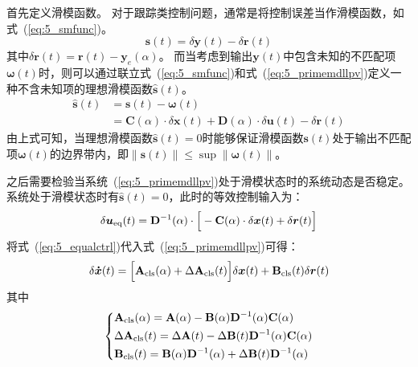 \documentclass{article}
\begin{document}
首先定义滑模函数。
对于跟踪类控制问题，通常是将控制误差当作滑模函数，如式~(\ref{eq:5_smfunc})。
\begin{equation}
\bm{s}(t)=\delta \bm{y}(t) - \delta \bm{r}(t)
\label{eq:5_smfunc}
\end{equation}
其中$\delta \bm{r}(t)=\bm{r}(t)-\bm{y}_e(\alpha)$。
而当考虑到输出$\bm{y}(t)$中包含未知的不匹配项$\bm{\omega}(t)$时，则可以通过联立式~(\ref{eq:5_smfunc})和式~(\ref{eq:5_primemdllpv})定义一种不含未知项的理想滑模函数$\bm{\hat s}(t)$。
\begin{equation}
\begin{aligned}
\bm{\hat s}(t) &= \bm{s}(t) - \bm{\omega}(t)\\
&=\mathbf{C}(\alpha)\cdot \delta \bm{x}(t)+\mathbf{D}(\alpha)\cdot \delta \bm{u}(t)-\delta \bm{r}(t)
\label{eq:5_smfuncideal}
\end{aligned}
\end{equation}
由上式可知，当理想滑模函数$\bm{\hat s}(t)=0$时能够保证滑模函数$\bm{s}(t)$处于输出不匹配项$\bm{\omega}(t)$的边界带内，即$\|\bm{s}(t)\| \leq \sup \|\bm{\omega}(t)\|$。

之后需要检验当系统~(\ref{eq:5_primemdllpv})处于滑模状态时的系统动态是否稳定。
系统处于滑模状态时有$\bm{\hat s}(t)=0$，此时的等效控制输入为：
\begin{equation}
\delta \bm{u}_{\rm{eq}}(t)=\mathbf{D}^{-1}(\alpha)\cdot\Big [-\mathbf{C}(\alpha)\cdot\delta \bm{x}(t)+\delta \bm{r}(t)\Big ]
\label{eq:5_equalctrl}
\end{equation}
将式~(\ref{eq:5_equalctrl})代入式~(\ref{eq:5_primemdllpv})可得：
\begin{equation}
   \delta \bm{\dot x}(t)=\Big [\mathbf{A}_{\rm{cls}}(\alpha)+\Delta \mathbf{A}_{\rm{cls}}(t)\Big ]\delta \bm{x}(t)+\mathbf{B}_{\rm{cls}}(t)\delta \bm{r}(t)
\label{eq:5_sysonsldsurf}
\end{equation}
其中
\begin{equation}
\left \{
\begin{aligned}
&\mathbf{A}_{\rm{cls}}(\alpha)= \mathbf{A}(\alpha)-\mathbf{B}(\alpha)\mathbf{D}^{-1}(\alpha)\mathbf{C}(\alpha)\\
&\Delta \mathbf{A}_{\rm{cls}}(t)= \Delta \mathbf{A}(t)-\Delta \mathbf{B}(t)\mathbf{D}^{-1}(\alpha)\mathbf{C}(\alpha) \\
&\mathbf{B}_{\rm{cls}}(t)= \mathbf{B}(\alpha)\mathbf{D}^{-1}(\alpha)+\Delta \mathbf{B}(t)\mathbf{D}^{-1}(\alpha)
\end{aligned}
\right .
\end{equation}
\end{document}
